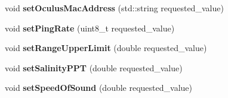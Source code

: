 \begin{DoxyCompactItemize}
void {\bfseries set\+Oculus\+Mac\+Address} (std\+::string requested\+\_\+value)
\item 
\mbox{\label{classOculusDriver_a26605d0f9f86f8ec56a84d8e137df2b6}} 
void {\bfseries set\+Ping\+Rate} (uint8\+\_\+t requested\+\_\+value)
\item 
\mbox{\label{classOculusDriver_abf5637497f857b678759e80c13263c70}} 
void {\bfseries set\+Range\+Upper\+Limit} (double requested\+\_\+value)
\item 
\mbox{\label{classOculusDriver_a7742fb44441bedc66a3d453edd46464d}} 
void {\bfseries set\+Salinity\+P\+PT} (double requested\+\_\+value)
\item 
\mbox{\label{classOculusDriver_acd9f89f796b28765e7e0445446053d59}} 
void {\bfseries set\+Speed\+Of\+Sound} (double requested\+\_\+value)
\end{DoxyCompactItemize}
